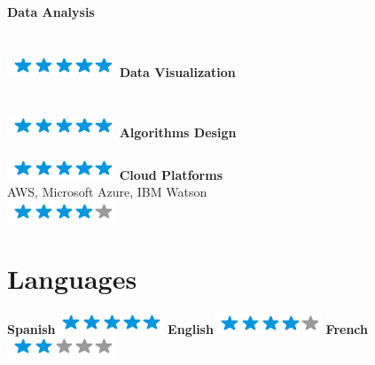 \documentclass[]{friggeri-cv}
\begin{document}
\begin{aside}
    \textbf{Data Analysis}\\\vspace{-.08in}{\tiny 2+ years of experience}\\\vspace{-.05in}{\scriptsize Pandas, Numpy \& SciPy}\\\includegraphics[scale=0.40]{img/5stars.png}
    \textbf{Data Visualization}\\\vspace{-.08in}{\tiny +2 years of experience}\\\vspace{-.05in}{\scriptsize Tableau, Seaborn, MatPlotLib }\\\includegraphics[scale=0.40]{img/5stars.png}
    \textbf{Algorithms Design}\\\vspace{-.08in}{\tiny 9+ years of experience}\\\includegraphics[scale=0.40]{img/5stars.png} 
    \textbf{Cloud Platforms}\\{\scriptsize AWS, Microsoft Azure, IBM Watson}\\\includegraphics[scale=0.40]{img/4stars.png}%
    ~
  \section{Languages}
    \textbf{Spanish}\includegraphics[scale=0.40]{img/5stars.png}
    \textbf{English}\includegraphics[scale=0.40]{img/4stars.png}
    \textbf{French}\includegraphics[scale=0.40]{img/2stars.png}
    ~
\end{aside}
\hspace{3cm}
\end{document}
